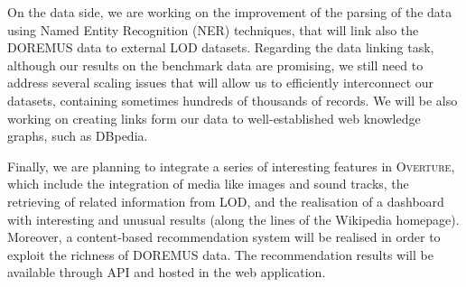 \documentclass{article}
\begin{document}
On the data side, we are working on the improvement of the parsing of the data using Named Entity Recognition (NER) techniques, that will link also the DOREMUS data to external LOD datasets. Regarding the data linking task, although our results on the benchmark data are promising, we still need to address several scaling issues that will allow us to efficiently interconnect our datasets, containing sometimes hundreds of thousands of records. We will be also working on creating links form our data to well-established web knowledge graphs, such as DBpedia.

Finally, we are planning to integrate a series of interesting features in \textsc{Overture}, which include the integration of media like images and sound tracks, the retrieving of related information from LOD, and the realisation of a dashboard with interesting and unusual results (along the lines of the Wikipedia homepage). Moreover, a content-based recommendation system will be realised in order to exploit the richness of DOREMUS data. The recommendation results will be available through API and hosted in the web application.



\end{document}
